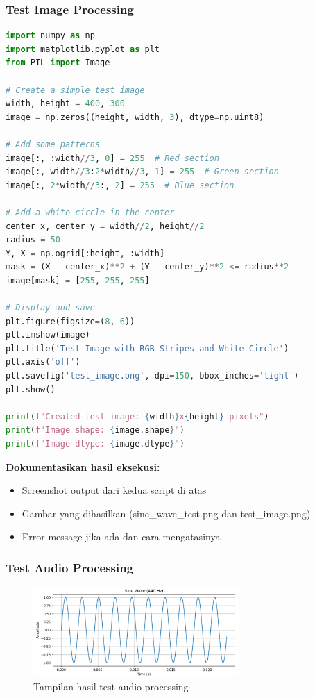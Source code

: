 \documentclass[11pt,a4paper]{article}
\begin{document}
\subsubsection{Test Image Processing}
\begin{lstlisting}[language=Python, caption=Test image processing sederhana]
import numpy as np
import matplotlib.pyplot as plt
from PIL import Image

# Create a simple test image
width, height = 400, 300
image = np.zeros((height, width, 3), dtype=np.uint8)

# Add some patterns
image[:, :width//3, 0] = 255  # Red section
image[:, width//3:2*width//3, 1] = 255  # Green section
image[:, 2*width//3:, 2] = 255  # Blue section

# Add a white circle in the center
center_x, center_y = width//2, height//2
radius = 50
Y, X = np.ogrid[:height, :width]
mask = (X - center_x)**2 + (Y - center_y)**2 <= radius**2
image[mask] = [255, 255, 255]

# Display and save
plt.figure(figsize=(8, 6))
plt.imshow(image)
plt.title('Test Image with RGB Stripes and White Circle')
plt.axis('off')
plt.savefig('test_image.png', dpi=150, bbox_inches='tight')
plt.show()

print(f"Created test image: {width}x{height} pixels")
print(f"Image shape: {image.shape}")
print(f"Image dtype: {image.dtype}")
\end{lstlisting}

\textbf{Dokumentasikan hasil eksekusi:}
\begin{itemize}
    \item Screenshot output dari kedua script di atas
    \item Gambar yang dihasilkan (sine\_wave\_test.png dan test\_image.png)
    \item Error message jika ada dan cara mengatasinya
\end{itemize}

\subsubsection{Test Audio Processing}
\begin{figure}[H]
    \centering
    \includegraphics[width=0.7\textwidth]{Figure/ss/12.png}
    \caption{Tampilan hasil test audio processing}
    \label{fig:audio_processing}
\end{figure}
\end{document}
